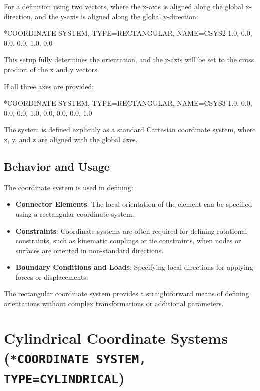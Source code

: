 For a definition using two vectors, where the x-axis is aligned along the global x-direction, and the y-axis is aligned along the global y-direction:


\begin{codeBlock}
*COORDINATE SYSTEM, TYPE=RECTANGULAR, NAME=CSYS2
1.0, 0.0, 0.0, 0.0, 1.0, 0.0
\end{codeBlock}


This setup fully determines the orientation, and the z-axis will be set to the cross product of the x and y vectors.


If all three axes are provided:


\begin{codeBlock}
*COORDINATE SYSTEM, TYPE=RECTANGULAR, NAME=CSYS3
1.0, 0.0, 0.0, 0.0, 1.0, 0.0, 0.0, 0.0, 1.0
\end{codeBlock}


The system is defined explicitly as a standard Cartesian coordinate system, where x, y, and z are aligned with the global axes.


\subsection{Behavior and Usage}


The coordinate system is used in defining:


\begin{itemize}
\item \textbf{Connector Elements}: The local orientation of the element can be specified using a rectangular coordinate system.
\item \textbf{Constraints}: Coordinate systems are often required for defining rotational constraints, such as kinematic couplings or tie constraints, when nodes or surfaces are oriented in non-standard directions.
\item \textbf{Boundary Conditions and Loads}: Specifying local directions for applying forces or displacements.
\end{itemize}


The rectangular coordinate system provides a straightforward means of defining orientations without complex transformations or additional parameters.


\section{Cylindrical Coordinate Systems (\texttt{*COORDINATE SYSTEM, TYPE=CYLINDRICAL})}


